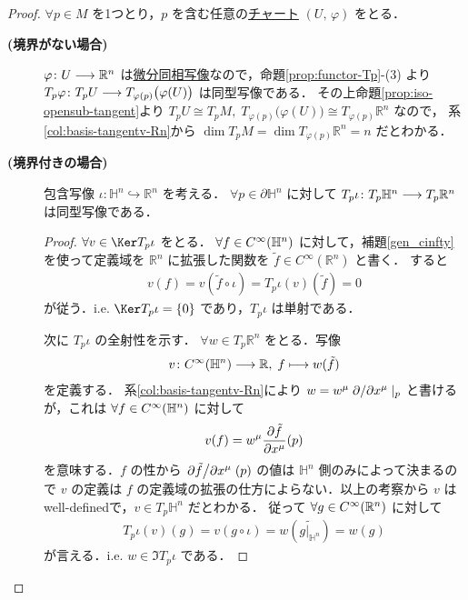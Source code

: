\documentclass[geometry_main]{subfiles}
\begin{document}
\begin{proof}
	$\forall p \in M$ を1つとり，$p$ を含む任意の\hyperref[diffmani]{\cinfty チャート} $(U,\, \varphi)$ をとる．
	\begin{description}
		\item[\textbf{(境界がない場合)}] $\varphi \colon U \longrightarrow \mathbb{R}^n$ は\hyperref[def.diff]{微分同相写像}なので，命題\ref{prop:functor-Tp}-(3) より $T_p \varphi \colon T_p U \longrightarrow T_{\varphi(p)} \bigl(\varphi(U)\bigr)$ は同型写像である．
		その上命題\ref{prop:iso-opensub-tangent}より $T_p U \cong T_p M,\; T_{\varphi(p)} \bigl( \varphi(U) \bigr) \cong T_{\varphi(p)} \mathbb{R}^n$ なので，
		系\ref{col:basis-tangentv-Rn}から $\dim T_p M = \dim T_{\varphi(p)} \mathbb{R}^n = n$ だとわかる．
		\item[\textbf{(境界付きの場合)}] 

		\hrulefill
		\begin{mylem}[label=lem:dim-tangentv-b]{}
			包含写像 $\iota \colon \mathbb{H}^n \hookrightarrow \mathbb{R}^n$ を考える．
			$\forall p \in \partial \mathbb{H}^n$ に対して $T_p \iota \colon T_p \mathbb{H}^n \longrightarrow T_p \mathbb{R}^n$ は同型写像である．
		\end{mylem}
		\begin{proof}
			$\forall v \in \Ker T_p \iota$ をとる．
			$\forall f \in C^\infty(\mathbb{H}^n)$ に対して，補題\ref{gen_cinfty}を使って定義域を $\mathbb{R}^n$ に拡張した\cinfty 関数を $\tilde{f} \in C^\infty(\mathbb{R}^n)$ と書く．
			すると
			\begin{align}
				v (f) = v (\tilde{f} \circ \iota) = T_p \iota (v) (\tilde{f}) = 0
			\end{align}
			が従う．i.e. $\Ker T_p \iota = \{0\}$ であり，$T_p \iota$ は単射である．

			次に $T_p \iota$ の全射性を示す．
			$\forall w \in T_p \mathbb{R}^n$ をとる．写像
			\begin{align}
				v \colon C^\infty(\mathbb{H}^n) \longrightarrow \mathbb{R},\; f \longmapsto w(\tilde{f})
			\end{align}
			を定義する．
			系\ref{col:basis-tangentv-Rn}により $w = w^\mu \pdv*{}{x^\mu}|_p$ と書けるが，これは $\forall f \in C^\infty(\mathbb{H}^n)$ に対して
			\begin{align}
				v(f) = w^\mu \pdv{\tilde{f}}{x^\mu}()(p)
			\end{align}
			を意味する．$f$ の\cinfty 性から $\pdv*{\tilde{f}}{x^\mu}()(p)$ の値は $\mathbb{H}^n$ 側のみによって決まるので $v$ の定義は $f$ の定義域の拡張の仕方によらない．以上の考察から $v$ はwell-definedで，$v \in T_p \mathbb{H}^n$ だとわかる．
			従って $\forall g \in C^\infty(\mathbb{R}^n)$ に対して
			\begin{align}
				T_p \iota(v)(g) = v(g \circ \iota) = w(\widetilde{g|_{\mathbb{H}^n}}) = w(g)
			\end{align}
			が言える．i.e. $w \in \Im T_p \iota$ である．
		\end{proof}
		\hrulefill


\end{description}
\end{proof}
\end{document}

